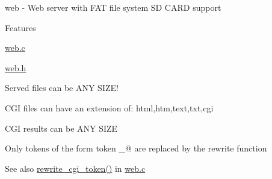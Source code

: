 \begin{DoxyItemize}
\begin{DoxyItemize}
\end{DoxyItemize}
\item web -\/ Web server with F\+AT file system SD C\+A\+RD support
\begin{DoxyItemize}
\item Features
\begin{DoxyItemize}
\item \hyperlink{web_8c}{web.\+c}
\item \hyperlink{web_8h}{web.\+h}
\end{DoxyItemize}
\item Served files can be A\+NY S\+I\+Z\+E!
\begin{DoxyItemize}
\item C\+GI files can have an extension of\+: html,htm,text,txt,cgi
\item C\+GI results can be A\+NY S\+I\+ZE
\end{DoxyItemize}
\item Only tokens of the form  token \+\_\+@ are replaced by the rewrite function
\begin{DoxyItemize}
\item \begin{DoxySeeAlso}{See also}
\hyperlink{web_8c_abfb5be0ab21dfe56bc934a8965154384}{rewrite\+\_\+cgi\+\_\+token()} in \hyperlink{web_8c}{web.\+c}
\end{DoxySeeAlso}


\end{DoxyItemize}
\end{DoxyItemize}
\end{DoxyItemize}
